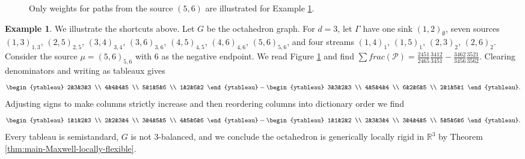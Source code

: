 \documentclass[11pt,letterpaper]{amsart}
\theoremstyle{definition}
\newtheorem{example}{Example}
\begin{document}
\begin{figure}[!ht]
{}
\caption{Only weights for paths from the source $(5,6)$ are illustrated for Example \ref{example:octahedron}.}
\label{fig:octahedron}
\end{figure}

\begin{example}\label{example:octahedron}
We illustrate the shortcuts above. Let $G$ be the octahedron graph. For $d=3$, let $\Gamma$ have one sink $(1,2)_\emptyset$, seven sources $(1,3)_{1,3}$, $(2,5)_{2,5}$, $(3,4)_{3,4}$, $(3,6)_{3,6}$, $(4,5)_{4,5}$, $(4,6)_{4,6}$, $(5,6)_{5,6}$, and four streams $(1,4)_1$, $(1,5)_1$, $(2,3)_2$, $(2,6)_2$. Consider the source $\mu = (5,6)_{5,6}$ with $6$ as the negative endpoint. We read Figure \ref{fig:octahedron} and find $\sum frac(\mathcal{P}) = \frac{2451}{2465} \frac{3412}{3451} - \frac{3462}{3456} \frac{3521}{3562}$. Clearing denominators and writing as tableaux gives
\begin{equation*}
    \begin{ytableau}
        2&3&3&3 \\ 4&4&4&5 \\ 5&1&5&6 \\ 1&2&6&2
    \end{ytableau} - 
    \begin{ytableau}
        3&3&2&3 \\ 4&5&4&4 \\ 6&2&6&5 \\ 2&1&5&1
    \end{ytableau}.
\end{equation*}
Adjusting signs to make columns strictly increase and then reordering columns into dictionary order we find
\begin{equation*}
    \begin{ytableau}
        1&1&2&3 \\ 2&2&3&4 \\ 3&4&5&5 \\ 4&5&6&6
    \end{ytableau} - 
    \begin{ytableau}
        1&1&2&2 \\ 2&3&3&4 \\ 3&4&4&5 \\ 5&5&6&6
    \end{ytableau}.
\end{equation*}
Every tableau is semistandard, $G$ is not $3$-balanced, and we conclude the octahedron is generically locally rigid in $\mathbb{R}^3$ by Theorem \ref{thm:main-Maxwell-locally-flexible}. 
\end{example}
\end{document}
